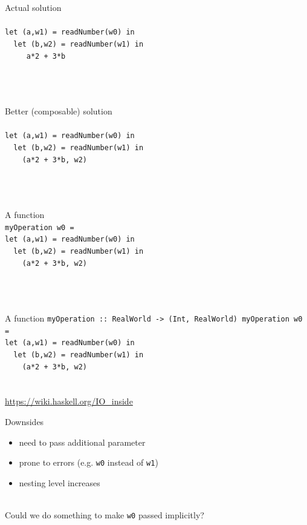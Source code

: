 \documentclass{beamer}
\begin{document}
\begin{frame}{Actual solution}
  \texttt{ \\ \ \\
    let (a,w1) = readNumber(w0) in \\
    \ \ let (b,w2) = readNumber(w1) in \\
    \ \ \ \ \ a*2 + 3*b
  } \\ \ \\ \ \\ \ 
\end{frame}

\begin{frame}{Better (composable) solution}
  \texttt{ \\ \ \\
    let (a,w1) = readNumber(w0) in \\
    \ \ let (b,w2) = readNumber(w1) in \\
    \ \ \ \ (a*2 + 3*b, w2)
  } \\ \ \\ \ \\ \ 
\end{frame}

\begin{frame}{A function}
  \texttt{ \\
    myOperation w0 = \\
    let (a,w1) = readNumber(w0) in \\
    \ \ let (b,w2) = readNumber(w1) in \\
    \ \ \ \ (a*2 + 3*b, w2)
  } \\ \ \\ \ \\ \ 
\end{frame}

\begin{frame}{A function}
  \texttt{myOperation ::\ RealWorld -> (Int, RealWorld)
    myOperation w0 = \\
    let (a,w1) = readNumber(w0) in \\
    \ \ let (b,w2) = readNumber(w1) in \\
    \ \ \ \ (a*2 + 3*b, w2)
  } \\ \ \\ \ \\ \url{https://wiki.haskell.org/IO_inside}
\end{frame}

\begin{frame}{Downsides}
  \pause
  \begin{itemize}
  \item need to pass additional parameter \pause
  \item prone to errors (e.g. \texttt{w0} instead of \texttt{w1}) \pause
  \item nesting level increases \pause
  \end{itemize} \ \\ Could we do something to make \texttt{w0} passed implicitly?
\end{frame}
\end{document}
